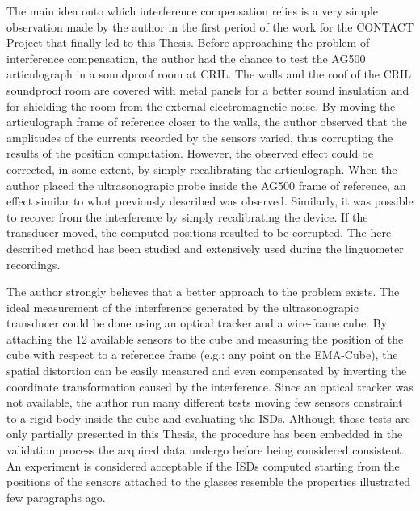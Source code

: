 The main idea onto which interference compensation relies is a very simple
observation made by the author in the first period of the work for the CONTACT
Project that finally led to this Thesis.
Before approaching the problem of interference compensation, the author had the
chance to test the AG500 articulograph in a soundproof room at CRIL.
The walls and the roof of the CRIL soundproof room are covered with metal 
panels for a better sound insulation and for shielding the room from the
external electromagnetic noise.
By moving the articulograph frame of reference closer to the walls, the author
observed that the amplitudes of the currents recorded by the sensors varied, 
thus corrupting the results of the position computation.
However, the observed effect could be corrected, in some extent, by simply 
recalibrating the articulograph.
When the author placed the ultrasonograpic probe inside the AG500 frame of
reference, an effect similar to what previously described was observed.
Similarly, it was possible to recover from the interference by simply
recalibrating the device.
If the transducer moved, the computed positions resulted to be corrupted.
The here described method has been studied and extensively used during the
linguometer recordings.\\


The author strongly believes that a better approach to the problem exists.
The ideal measurement of the interference generated by the ultrasonograpic
transducer could be done using an optical tracker and a wire-frame cube.
By attaching the 12 available sensors to the cube and measuring the position 
of the cube with respect to a reference frame (e.g.: any point on the  
EMA-Cube), the spatial distortion can be easily measured and even compensated by
inverting the coordinate transformation caused by the interference.
Since an optical tracker was not available, the author run many
different tests moving few sensors constraint to a rigid body inside the cube 
and evaluating the ISDs.
Although those tests are only partially presented in this Thesis, the procedure
has been  embedded in the validation process the acquired data undergo before
being considered consistent.
An experiment is considered acceptable if the ISDs computed starting from 
the positions of the sensors attached to the glasses resemble the properties
illustrated few paragraphs ago.

